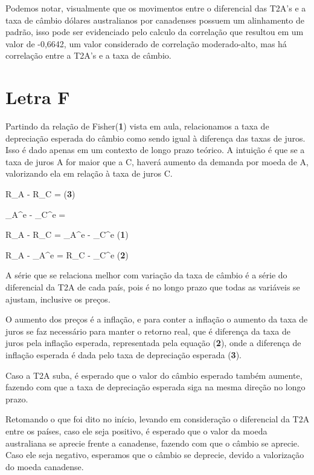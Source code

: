 \documentclass[a4paper,12pt]{article}[abntex2]
\begin{document}
Podemos notar, visualmente que os movimentos entre o diferencial das T2A's e a taxa de câmbio dólares australianos por canadenses possuem um alinhamento de padrão, isso pode ser evidenciado pelo calculo da correlação que resultou em um valor de -0,6642, um valor considerado de correlação moderado-alto, mas há correlação entre a T2A's e a taxa de câmbio.


\section{\textbf{Letra F}}

Partindo da relação de Fisher(\textbf{1}) vista em aula, relacionamos a taxa de depreciação esperada do câmbio como sendo igual à diferença das taxas de juros. Isso é dado apenas em um contexto de longo prazo teórico. A intuição é que se a taxa de juros A for maior que a C, haverá aumento da demanda por moeda de A, valorizando ela em relação à taxa de juros C.

R_{A} -  R_{C} =  (\textbf{3})

\pi_{A}^{e} - \pi_{C}^{e} = 

R_{A} -  R_{C} = \pi_{A}^{e} - \pi_{C}^{e}  (\textbf{1})

R_{A} -  \pi_{A}^{e} = R_{C} - \pi_{C}^{e} (\textbf{2})

A série que se relaciona melhor com variação da taxa de câmbio é a série do diferencial da T2A de cada país, pois é no longo prazo que todas as variáveis se ajustam, inclusive os preços.

O aumento dos preços é a inflação, e para conter a inflação o aumento da taxa de juros se faz necessário para manter o retorno real, que é diferença da taxa de juros pela inflação esperada, representada pela equação (\textbf{2}), onde a diferença de inflação esperada é dada pelo taxa de depreciação esperada (\textbf{3}).

 Caso a T2A suba, é esperado que o valor do câmbio esperado também aumente, fazendo com que a taxa de depreciação esperada siga na mesma direção no longo prazo.

Retomando o que foi dito no início, levando em consideração o diferencial da T2A entre os países, caso ele seja positivo, é esperado que o valor da moeda australiana se aprecie frente a canadense, fazendo com que o câmbio se aprecie. Caso ele seja negativo, esperamos que o câmbio se deprecie, devido a valorização do moeda canadense.
\end{document}
